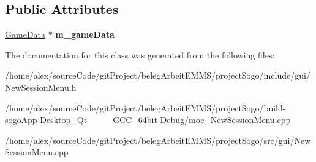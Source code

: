 \subsection*{Public Attributes}
\begin{DoxyCompactItemize}
\item 
\hypertarget{classNewSessionMenu_a1e5fc5bfe12c63b0f99df1dc3ffec0ba}{\hyperlink{classGameData}{Game\-Data} $\ast$ {\bfseries m\-\_\-game\-Data}}\label{classNewSessionMenu_a1e5fc5bfe12c63b0f99df1dc3ffec0ba}

\end{DoxyCompactItemize}


The documentation for this class was generated from the following files\-:\begin{DoxyCompactItemize}
\item 
/home/alex/source\-Code/git\-Project/beleg\-Arbeit\-E\-M\-M\-S/project\-Sogo/include/gui/New\-Session\-Menu.\-h\item 
/home/alex/source\-Code/git\-Project/beleg\-Arbeit\-E\-M\-M\-S/project\-Sogo/build-\/sogo\-App-\/\-Desktop\-\_\-\-Qt\-\_\-\_\-\_\-\_\-\-G\-C\-C\-\_\-64bit-\/\-Debug/moc\-\_\-\-New\-Session\-Menu.\-cpp\item 
/home/alex/source\-Code/git\-Project/beleg\-Arbeit\-E\-M\-M\-S/project\-Sogo/src/gui/New\-Session\-Menu.\-cpp\end{DoxyCompactItemize}
